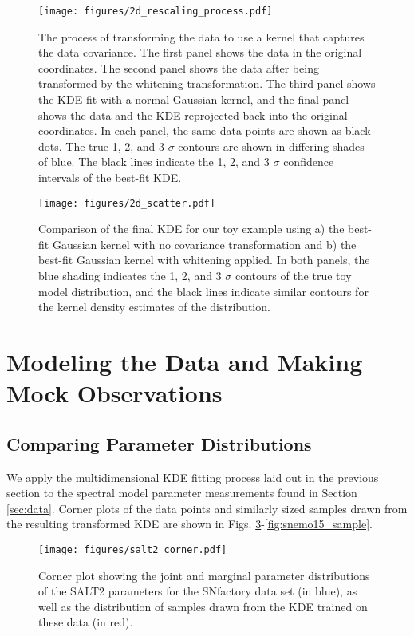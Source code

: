 \begin{figure}
    \centering
    \texttt{[image: figures/2d\_rescaling\_process.pdf]}
    \caption{The process of transforming the data to use a kernel that captures the data covariance. The first panel shows the data in the original coordinates. The second panel shows the data after being transformed by the whitening transformation. The third panel shows the KDE fit with a normal Gaussian kernel, and the final panel shows the data and the KDE reprojected back into the original coordinates. In each panel, the same data points are shown as black dots. The true 1, 2, and 3 $\sigma$ contours are shown in differing shades of blue. The black lines indicate the 1, 2, and 3 $\sigma$ confidence intervals of the best-fit KDE.}
    \label{fig:2d_rescaling_process}
\end{figure}

\begin{figure}
    \centering
    \texttt{[image: figures/2d\_scatter.pdf]}
    \caption{Comparison of the final KDE for our toy example using a) the best-fit Gaussian kernel with no covariance transformation and b) the best-fit Gaussian kernel with whitening applied. In both panels, the blue shading indicates the 1, 2, and 3 $\sigma$ contours of the true toy model distribution, and the black lines indicate similar contours for the kernel density estimates of the distribution.}
    \label{fig:2d_scatter_scaled}
\end{figure}

\section{Modeling the Data and Making Mock Observations}
\label{sec:making_mocks}
\subsection{Comparing Parameter Distributions}
We apply the multidimensional KDE fitting process laid out in the previous section to the spectral model parameter measurements found in Section \ref{sec:data}. Corner plots of the data points and similarly sized samples drawn from the resulting transformed KDE are shown in Figs. \ref{fig:salt2_sample}-\ref{fig:snemo15_sample}.

\begin{figure}
    \centering
\texttt{[image: figures/salt2\_corner.pdf]}
    \caption{Corner plot showing the joint and marginal parameter distributions of the SALT2 parameters for the SNfactory data set (in blue), as well as the distribution of samples drawn from the KDE trained on these data (in red).}
    \label{fig:salt2_sample}
\end{figure}

